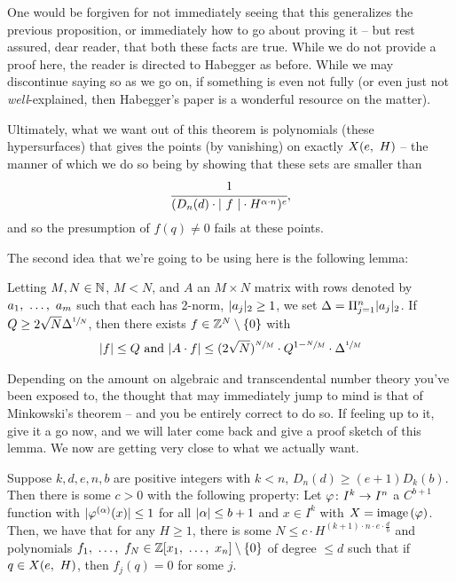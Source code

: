 One would be forgiven for not immediately seeing that this generalizes the previous proposition, or immediately how to go about proving it -- but rest assured, dear reader, that both these facts are true. While we do not provide a proof here, the reader is directed to Habegger \cite{habegger_diophantine_2016} as before. While we may discontinue saying so as we go on, if something is even not fully (or even just not \emph{well}-explained, then Habegger's paper is a wonderful resource on the matter).

Ultimately, what we want out of this theorem is polynomials (these hypersurfaces) that gives the points (by vanishing) on exactly $\XeH[H]{e}$ -- the manner of which we do so being by showing that these sets are smaller than
  \begin{align*}
    \cfrac{1}{(D_n(d) \cdot \lvrv{f} \cdot H^{\alpha \cdot n})^e},
  \end{align*}
and so the presumption of $f(q) \neq 0$ fails at these points.

The second idea that we're going to be using here is the following lemma:
\begin{lemma}
  Letting $M, N \in \N$, $M < N$, and $A$ an $M \times N$ matrix with rows denoted by $\vonevm{a}{m}$ such that each has 2-norm, $\twonorm{a_j} \geq 1$, we set $\Delta = \Pi_{j=1}^{n} \twonorm{a_j}$. If $Q \geq 2 \sqrt{N} \Delta^{\sfrac{1}{N}}$, then there exists $f \in \Z^N \setminus \zeroset$ with
    \begin{align*}
      \norm{f} \leq Q \textrm{ and } \norm{A \cdot f} \leq (2 \sqrt{N})^{\sfrac{N}{M}} \cdot Q^{1 - \sfrac{N}{M}} \cdot \Delta^{\sfrac{1}{M}}
    \end{align*}
\end{lemma}

Depending on the amount on algebraic and transcendental number theory you've been exposed to, the thought that may immediately jump to mind is that of Minkowski's theorem -- and you be entirely correct to do so. If feeling up to it, give it a go now, and we will later come back and give a proof sketch of this lemma. We now are getting very close to what we actually want.


\begin{proposition}
  Suppose $k, d, e, n, b$ are positive integers with $k < n$, $D_n(d) \geq (e + 1) D_k(b)$. Then there is some $c > 0$ with the following property: Let $\funcdom{\phi}{I^k}{I^n}$ a $C^{b + 1}$ function with $\norm{\phi^{(\alpha)}(x)} \leq 1$ for all $\norm{\alpha} \leq b + 1$ and $x \in I^{k}$ with $X = \image{\phi}$. Then, we have that for any $H \geq 1$, there is some $N \leq c \cdot H^{(k+1) \cdot n \cdot e \cdot \frac{d}{b}}$ and polynomials $\vonevm{f}{N} \in \Z[\vonevm{x}{n}] \setminus \zeroset$ of degree $\leq d$ such that if $q \in \XeH{e}$, then $f_j(q) = 0$ for some $j$.
  \label{prop:pre_dioph}
\end{proposition}

